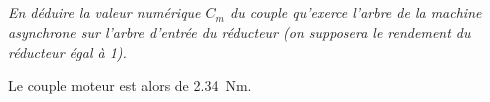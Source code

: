 \documentclass[10pt,fleqn]{article} %
\newif\ifcolle
\newif\ifnormal
\begin{document}
\begin{multicols}{2}
\begin{multicols}{2}
\subparagraph{}\textit{En déduire la valeur numérique $C_m$ du couple qu’exerce l’arbre de la machine asynchrone sur l’arbre
d’entrée du réducteur (on supposera le rendement du réducteur égal à 1).}
\ifprof
\begin{corrige}
Le couple moteur est alors de \SI{2,34}{Nm}.
\end{corrige}
\else
\fi



\ifprof
\else

\footnotesize
%
\ifcolle
\else
\ifnormal
\vspace{.5cm}
\noindent \textbf{Éléments de corrigé}
\vspace{-.5cm}
\begin{multicols}{2}
\begin{enumerate}
\item \SI{1,26}{rad.s^{-1}}.
\item \SI{1292}{tr.min^{-1}}.
\item Oui.
\item $I$.
\item  $\torseurl{ F_B\vect{x_{2}}}{\vect{0}}{B}$.
\item $ F_B    = \dfrac{mgx_G}{L_2  \sin  \left(\alpha_{12}-\alpha_2\right)} $.
\item $C_{\text{red}}-RF_B \sin \left( \alpha_3 - \alpha_2\right) = 0$.
\item \SI{252}{Nm}.
\item \SI{2,34}{Nm}.
\end{enumerate}
\end{multicols}
\else
\fi
\fi
\fi

\normalsize


\ifprof
\end{multicols}
\else
\end{multicols}
\fi
\end{document}

